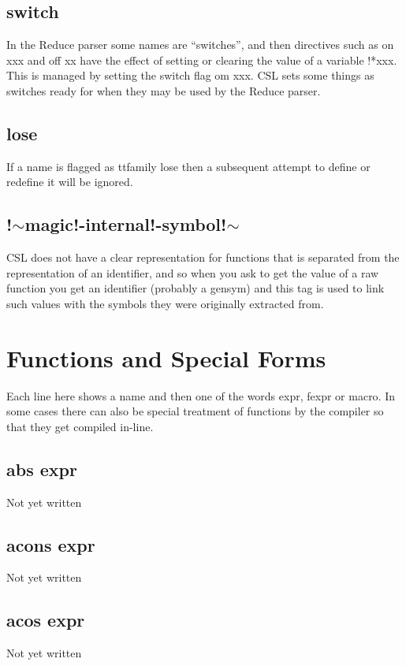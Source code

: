 \documentclass[a4paper,11pt]{article}
\begin{document}
\subsection{\ttfamily switch}
In the Reduce parser some names are ``switches'', and then directives such
as {\ttfamily on xxx} and {\ttfamily off xx} have the effect of setting or
clearing the value of a variable {\ttfamily !*xxx}. This is managed by
setting the {\ttfamily switch} flag om {\ttfamily xxx}. CSL sets some
things as switches ready for when they may be used by the Reduce parser.
\subsection{\ttfamily lose}
If a name is flagged as {ttfamily lose} then a subsequent attempt to
define or redefine it will be ignored.
\subsection{\ttfamily !$\sim$magic!-internal!-symbol!$\sim$}
CSL does not have a clear representation for functions that is separated from
the representation of an identifier, and so when you ask to get the value
of a raw function you get an identifier (probably a gensym) and this
tag is used to link such values with the symbols they were originally
extracted from.

\section{Functions and Special Forms}

Each line here shows a name and then one of the words {\ttfamily expr},
{\ttfamily fexpr} or {\ttfamily macro}. In some cases there can also be special
treatment of functions by the compiler so that they get compiled in-line.

\subsection{\ttfamily abs expr}
Not yet written

\subsection{\ttfamily acons expr}
Not yet written

\subsection{\ttfamily acos expr}
Not yet written
\end{document}
